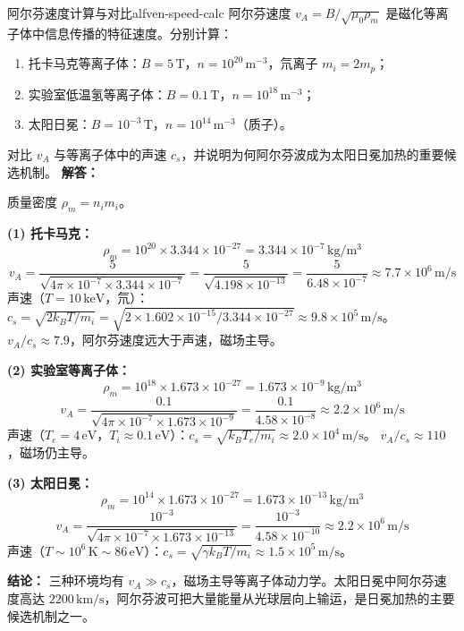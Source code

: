 \begin{example}{阿尔芬速度计算与对比}{alfven-speed-calc}
阿尔芬速度 $v_A = B/\sqrt{\mu_0\rho_m}$ 是磁化等离子体中信息传播的特征速度。分别计算：
\begin{enumerate}[label=(\arabic*)]
\item 托卡马克等离子体：$B=5\,\mathrm{T}$，$n=10^{20}\,\mathrm{m}^{-3}$，氘离子 $m_i=2m_p$；
\item 实验室低温氢等离子体：$B=0.1\,\mathrm{T}$，$n=10^{18}\,\mathrm{m}^{-3}$；
\item 太阳日冕：$B=10^{-3}\,\mathrm{T}$，$n=10^{14}\,\mathrm{m}^{-3}$（质子）。
\end{enumerate}
对比 $v_A$ 与等离子体中的声速 $c_s$，并说明为何阿尔芬波成为太阳日冕加热的重要候选机制。
\tcblower
\textbf{解答：}

质量密度 $\rho_m = n_i m_i$。

\textbf{(1) 托卡马克：}
\[
\rho_m = 10^{20}\times 3.344\times 10^{-27} = 3.344\times 10^{-7}\,\mathrm{kg/m^3}
\]
\[
v_A = \frac{5}{\sqrt{4\pi\times 10^{-7}\times 3.344\times 10^{-7}}} = \frac{5}{\sqrt{4.198\times 10^{-13}}} = \frac{5}{6.48\times 10^{-7}} \approx 7.7\times 10^6\,\mathrm{m/s}
\]
声速（$T=10\,\mathrm{keV}$，氘）：$c_s = \sqrt{2k_{\!B}T/m_i} = \sqrt{2\times 1.602\times 10^{-15}/3.344\times 10^{-27}} \approx 9.8\times 10^5\,\mathrm{m/s}$。
$v_A / c_s \approx 7.9$，阿尔芬速度远大于声速，磁场主导。

\textbf{(2) 实验室等离子体：}
\[
\rho_m = 10^{18}\times 1.673\times 10^{-27} = 1.673\times 10^{-9}\,\mathrm{kg/m^3}
\]
\[
v_A = \frac{0.1}{\sqrt{4\pi\times 10^{-7}\times 1.673\times 10^{-9}}} = \frac{0.1}{4.58\times 10^{-8}} \approx 2.2\times 10^6\,\mathrm{m/s}
\]
声速（$T_e=4\,\mathrm{eV}$，$T_i\approx 0.1\,\mathrm{eV}$）：$c_s = \sqrt{k_{\!B}T_e/m_i} \approx 2.0\times 10^4\,\mathrm{m/s}$。
$v_A / c_s \approx 110$，磁场仍主导。

\textbf{(3) 太阳日冕：}
\[
\rho_m = 10^{14}\times 1.673\times 10^{-27} = 1.673\times 10^{-13}\,\mathrm{kg/m^3}
\]
\[
v_A = \frac{10^{-3}}{\sqrt{4\pi\times 10^{-7}\times 1.673\times 10^{-13}}} = \frac{10^{-3}}{4.58\times 10^{-10}} \approx 2.2\times 10^6\,\mathrm{m/s}
\]
声速（$T\sim 10^6\,\mathrm{K}\sim 86\,\mathrm{eV}$）：$c_s = \sqrt{\gamma k_{\!B}T/m_i} \approx 1.5\times 10^5\,\mathrm{m/s}$。

\textbf{结论：} 三种环境均有 $v_A \gg c_s$，磁场主导等离子体动力学。太阳日冕中阿尔芬速度高达 $2200\,\mathrm{km/s}$，阿尔芬波可把大量能量从光球层向上输运，是日冕加热的主要候选机制之一。
\end{example}

